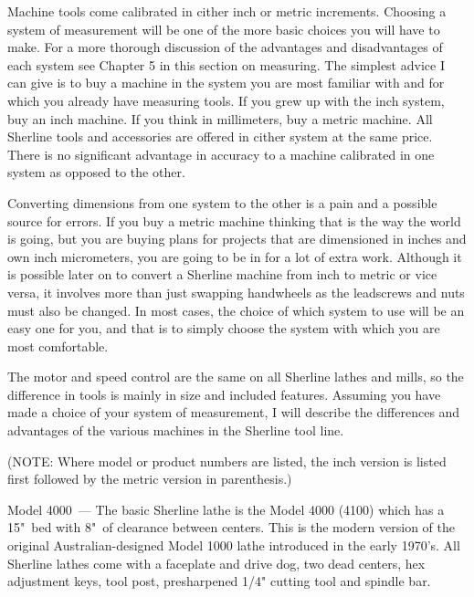 
Machine tools come calibrated in cither inch or metric increments. Choosing a
system of measurement will be one of the more basic choices you will have to
make. For a more thorough discussion of the advantages and disadvantages of each
system see Chapter 5 in this section on measuring. The simplest advice I can
give is to buy a machine in the system you are most familiar with and for which
you already have measuring tools. If you grew up with the inch system, buy an
inch machine. If you think in millimeters, buy a metric machine. All Sherline
tools and accessories are offered in cither system at the same price. There is
no significant advantage in accuracy to a machine calibrated in one system as
opposed to the other.

Converting dimensions from one system to the other is a pain and a possible
source for errors. If you buy a metric machine thinking that is the way the
world is going, but you are buying plans for projects that are dimensioned in
inches and own inch micrometers, you are going to be in for a lot of extra
work. Although it is possible later on to convert a Sherline machine from inch
to metric or vice versa, it involves more than just swapping handwheels as the
leadscrews and nuts must also be changed. In most cases, the choice of which
system to use will be an easy one for you, and that is to simply choose the
system with which you are most comfortable.

\secup

\secdown

The motor and speed control are the same on all Sherline lathes and mills, so
the difference in tools is mainly in size and included features. Assuming you
have made a choice of your system of measurement, I will describe the
differences and advantages of the various machines in the Sherline tool line.

(NOTE: Where model or product numbers are listed, the inch version is listed
first followed by the metric version in parenthesis.)

\secdown

Model 4000\ --- The basic Sherline lathe is the Model 4000 (4100) which has a
15"\ bed with 8"\ of clearance between centers. This is the modern version of
the original Australian-designed Model 1000 lathe introduced in the early
1970's. All Sherline lathes come with a faceplate and drive dog, two dead
centers, hex adjustment keys, tool post, presharpened 1/4" cutting tool and
spindle bar.

